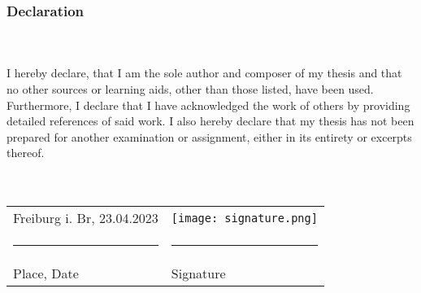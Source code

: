 \subsubsection{Declaration}\hfill\\\\
\noindent I hereby declare, that I am the sole author and composer of my thesis and that no other sources or learning aids, other than those listed, have been used. 
Furthermore, I declare that I have acknowledged the work of others by providing detailed references of said work.  \newline
I also hereby declare that my thesis has not been prepared for another examination or assignment, either in its entirety or excerpts thereof. 
\\
\\
\\
\begin{tabular}{p{} l}
  Freiburg i. Br, 23.04.2023   &   \texttt{[image: signature.png]} \\
  \rule{\textwidth/3}{0.4pt}   &   \rule{\textwidth/3}{0.4pt} \\
  Place, Date                  &   Signature
\end{tabular}